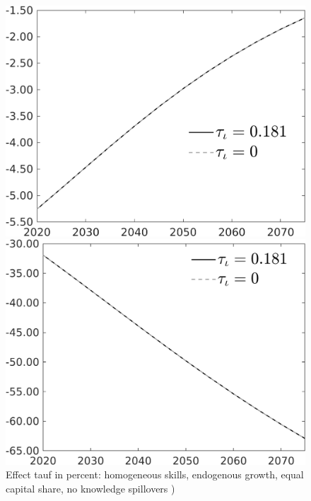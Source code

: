 \documentclass[12pt]{article}
\begin{document}
\begin{figure}[h!!]
	\centering
	\caption{Effect tauf in percent: homogeneous skills, endogenous growth, equal capital share, no knowledge spillovers )}\label{fig:Leveltauf_nsk1_xgr0_equalcapShare_noknow_notaul2}
	\begin{minipage}[]{0.32\textwidth}
		\includegraphics[width=1\textwidth]{../../codding_model/own_basedOnFried/optimalPol_010922_revision/figures/all_13Sept22/PerdifNoTauf_Equlab_regime0_CompTaul_sn_spillover0_nsk1_xgr0_knspil1_sep1_LFlimit0_emsbase0_countec0_GovRev0_etaa0.79_lgd1.png}
	\end{minipage}	
	\begin{minipage}[]{0.32\textwidth}
	\includegraphics[width=1\textwidth]{../../codding_model/own_basedOnFried/optimalPol_010922_revision/figures/all_13Sept22/PerdifNoTauf_Equlab_regime0_CompTaul_sff_spillover0_nsk1_xgr0_knspil1_sep1_LFlimit0_emsbase0_countec0_GovRev0_etaa0.79_lgd1.png}

\end{minipage}
\end{figure}
\end{document}

